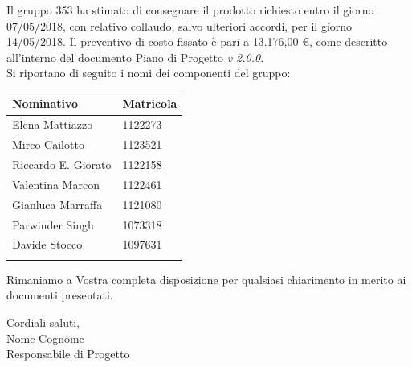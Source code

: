\documentclass[openany, a4paper, 12pt]{letter}
\newcommand{\Valentina}{Valentina Marcon\xspace}
\newcommand{\Mirco}{Mirco Cailotto\xspace}
\newcommand{\Riccardo}{Riccardo E. Giorato\xspace}
\newcommand{\Davide}{Davide Stocco\xspace}
\newcommand{\Parwinder}{Parwinder Singh\xspace}
\newcommand{\Elena}{Elena Mattiazzo\xspace}
\newcommand{\Gianluca}{Gianluca Marraffa\xspace}
\newcommand{\vrdue}{\textit{v 2.0.0}\xspace} %
\begin{document}
\begin{letter}
		
		Il gruppo 353 ha stimato di consegnare il prodotto richiesto entro il giorno 07/05/2018,
		con relativo collaudo, salvo ulteriori accordi, per il giorno 14/05/2018. Il preventivo di costo
		fissato è pari a 13.176,00 \euro, come descritto all'interno del documento Piano di Progetto \vrdue.
		\medskip \\
		Si riportano di seguito i nomi dei componenti del gruppo:\\
		
		\renewcommand*{\arraystretch}{1.2}
		\begin{longtable}[H]{p{6cm}p{2.5cm}}
			\rowcolor{CHeader}   
			\color{CHeaderText} \textbf{Nominativo} & \color{CHeaderText} \textbf{Matricola}\\
			\endhead
			\Elena & 1122273 \\
			\Mirco & 1123521 \\
			\Riccardo & 1122158 \\
			\Valentina &  1122461 \\
			\Gianluca & 1121080 \\
			\Parwinder & 1073318 \\
			\Davide & 1097631 \\
			\hiderowcolors
		\end{longtable}
		
		Rimaniamo a Vostra completa disposizione per qualsiasi chiarimento in merito ai documenti presentati.
		\begin{flushleft}
			Cordiali saluti,\\
			Nome Cognome\\
			Responsabile di Progetto\\
		\end{flushleft}
	\end{letter}
\end{document}
